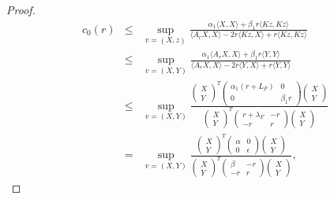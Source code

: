 \documentclass{article}
\theoremstyle{definition}
\begin{document}
\begin{proof}
\begin{eqnarray}
c_0(r) &\leq& \sup_{v = (X,z)} \frac{\alpha_1 \langle X,X \rangle + \beta_1 r \langle Kz, Kz\rangle}{\langle A_rX,X\rangle - 2r \langle Kz, X\rangle + r \langle Kz, Kz\rangle} \\ 
&\leq& \sup_{v = (X,Y)} \frac{\alpha_1 \langle A_r X,X \rangle + \beta_1 r \langle Y, Y\rangle}{\langle A_r X,X\rangle - 2r \langle Y, X\rangle + r \langle Y, Y\rangle} \\ 
&\leq& \sup_{v = (X,Y)} \frac{\begin{pmatrix} X \\ Y \end{pmatrix}^T \begin{pmatrix} \alpha_1 (r + L_F) & 0 \\ 0 & \beta_1 r \end{pmatrix} \begin{pmatrix} X \\ Y \end{pmatrix}}{\begin{pmatrix} X \\ Y \end{pmatrix}^T \begin{pmatrix} r + \lambda_F & -r \\ -r & r \end{pmatrix} \begin{pmatrix} X \\ Y \end{pmatrix}} \\ 
&=& \sup_{v = (X,Y)} \frac{\begin{pmatrix} X \\ Y \end{pmatrix}^T \begin{pmatrix} \alpha & 0 \\ 0 & \epsilon \end{pmatrix} \begin{pmatrix} X \\ Y \end{pmatrix}}{\begin{pmatrix} X \\ Y \end{pmatrix}^T \begin{pmatrix} \beta & -r \\ -r & r \end{pmatrix} \begin{pmatrix} X \\ Y \end{pmatrix}}, 
\end{eqnarray}

\end{proof}
\end{document}
